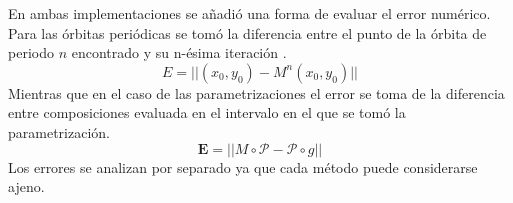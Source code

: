 En ambas implementaciones se añadi\'o una forma de evaluar el error num\'erico. Para las \'orbitas peri\'odicas se tom\'o la diferencia entre el punto de la \'orbita de periodo $n$ encontrado y su n-\'esima iteraci\'on .
\begin{equation}
	E = ||(x_{0},y_{0})-M^{n}(x_{0},y_{0})||
	\label{errororbitasperiodicas}
\end{equation}
Mientras que en el caso de las parametrizaciones el error se toma de la diferencia entre composiciones evaluada en el intervalo en el que se tom\'o la parametrizaci\'on. 
\begin{equation}
	\mathbf{E} = || M\circ \mathcal{P}- \mathcal{P}\circ g||
\end{equation}
Los errores se analizan por separado ya que cada m\'etodo puede considerarse ajeno. 






